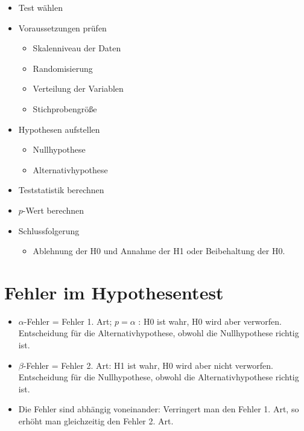 \documentclass[
]{book}
\providecommand{\tightlist}{%
  \setlength{\itemsep}{0pt}\setlength{\parskip}{0pt}}
\begin{document}
\begin{itemize}
\tightlist
\item
  Test wählen
\item
  Voraussetzungen prüfen

  \begin{itemize}
  \tightlist
  \item
    Skalenniveau der Daten
  \item
    Randomisierung
  \item
    Verteilung der Variablen
  \item
    Stichprobengröße
  \end{itemize}
\item
  Hypothesen aufstellen

  \begin{itemize}
  \tightlist
  \item
    Nullhypothese
  \item
    Alternativhypothese
  \end{itemize}
\item
  Teststatistik berechnen
\item
  \(p\)-Wert berechnen
\item
  Schlussfolgerung

  \begin{itemize}
  \tightlist
  \item
    Ablehnung der H0 und Annahme der H1 oder Beibehaltung der H0.
  \end{itemize}
\end{itemize}

\hypertarget{fehler-im-hypothesentest}{%
\section{Fehler im Hypothesentest}\label{fehler-im-hypothesentest}}

\begin{itemize}
\tightlist
\item
  \(\alpha\)-Fehler = Fehler 1. Art; \(p = \alpha\) : H0 ist wahr, H0 wird aber verworfen. Entscheidung für die Alternativhypothese, obwohl die Nullhypothese richtig ist.
\item
  \(\beta\)-Fehler = Fehler 2. Art: H1 ist wahr, H0 wird aber nicht verworfen. Entscheidung für die Nullhypothese, obwohl die Alternativhypothese richtig ist.
\item
  Die Fehler sind abhängig voneinander: Verringert man den Fehler 1. Art, so erhöht man gleichzeitig den Fehler 2. Art.
\end{itemize}
\end{document}
